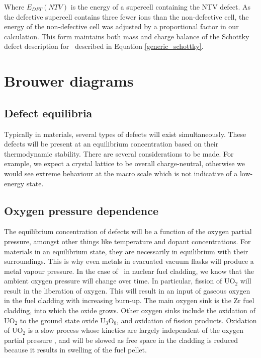 Where $E_{DFT}(NTV)$ is the energy of a supercell containing the NTV defect. As the defective supercell contains three fewer ions than the non-defective cell, the energy of the non-defective cell was adjusted by a proportional factor in our calculation. This form maintains both mass and charge balance of the Schottky defect description for \zirconia\ described in Equation \ref{generic_schottky}.

\section{Brouwer diagrams}

\subsection{Defect equilibria}

Typically in materials, several types of defects will exist simultaneously. These defects will be present at an equilibrium concentration based on their thermodynamic stability. There are several considerations to be made. For example, we expect a crystal lattice to be overall charge-neutral, otherwise we would see extreme behaviour at the macro scale which is not indicative of a low-energy state.

\subsection{Oxygen pressure dependence}

The equilibrium concentration of defects will be a function of the oxygen partial pressure, amongst other things like temperature and dopant concentrations. For materials in an equilibrium state, they are necessarily in equilibrium with their surroundings. This is why even metals in evacuated vacuum flasks will produce a metal vapour pressure. In the case of \zirconia\ in nuclear fuel cladding, we know that the ambient oxygen pressure will change over time. In particular, fission of UO$_{2}$ will result in the liberation of oxygen. This will result in an input of gaseous oxygen in the fuel cladding with increasing burn-up. The main oxygen sink is the Zr fuel cladding, into which the oxide grows. Other oxygen sinks include the oxidation of UO$_{2}$ to the ground state oxide U$_{3}$O$_{8}$, and oxidation of fission products. Oxidation of UO$_{2}$ is a slow process whose kinetics are largely independent of the oxygen partial pressure \cite{Desgranges2009NeutronUO2}, and will be slowed as free space in the cladding is reduced because it results in swelling of the fuel pellet. 

